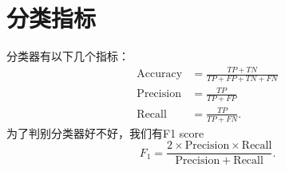 \section{分类指标}
分类器有以下几个指标：
\begin{align*}
		\mathrm{Accuracy}  &= \frac{TP + TN}{TP + FP + TN + FN} \\
		\mathrm{Precision}  &=  \frac{TP}{TP+FP} \\
		\mathrm{Recall}  &=  \frac{TP}{TP+FN} 
.\end{align*} 
为了判别分类器好不好，我们有F1 score
\[
F_1 = \frac{2 \times \mathrm{Precision} \times \mathrm{Recall}  }{ \mathrm{Precision} + \mathrm{Recall}  }
.\] 



